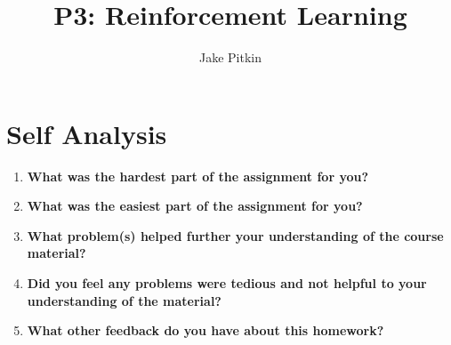 \documentclass[fleqn]{hw}
\title{P3: Reinforcement Learning}
\institute{University of Utah}
\author{Jake Pitkin}
\begin{document}
\maketitle

\section*{Self Analysis}

\begin{enumerate}
	\item \textbf{What was the hardest part of the assignment for you?}
	\item \textbf{What was the easiest part of the assignment for you?}
	\item \textbf{What problem(s) helped further your understanding of the course material?}
	\item \textbf{Did you feel any problems were tedious and not helpful to your understanding of the
material?}
	\item \textbf{What other feedback do you have about this homework?}
\end{enumerate}
\end{document}
